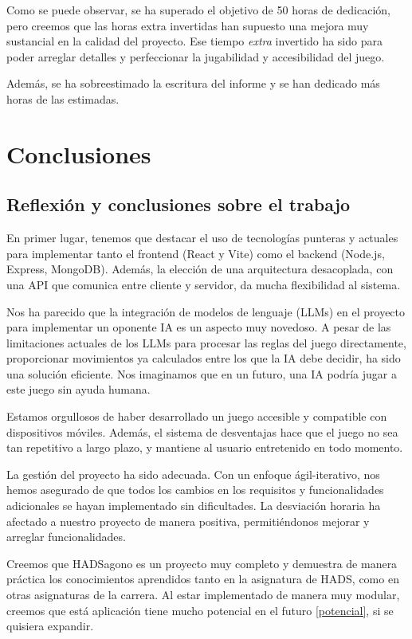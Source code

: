 \documentclass[12pt,epsf,titlepage,a4paper]{article}
\begin{document}
Como se puede observar, se ha superado el objetivo de 50 horas de dedicación, pero creemos que las horas extra invertidas han supuesto una mejora muy sustancial en la calidad del proyecto. Ese tiempo \emph{extra} invertido ha sido para poder arreglar detalles y perfeccionar la jugabilidad y accesibilidad del juego.

Además, se ha sobreestimado la escritura del informe y se han dedicado más horas de las estimadas.

\pagebreak

\section{Conclusiones}

\subsection{Reflexión y conclusiones sobre el trabajo}

En primer lugar, tenemos que destacar el uso de tecnologías punteras y actuales para implementar tanto el frontend (React y Vite) como el backend (Node.js, Express, MongoDB). Además, la elección de una arquitectura desacoplada, con una API que comunica entre cliente y servidor, da mucha flexibilidad al sistema.

Nos ha parecido que la integración de modelos de lenguaje (LLMs) en el proyecto para implementar un oponente IA es un aspecto muy novedoso. A pesar de las limitaciones actuales de los LLMs para procesar las reglas del juego directamente, proporcionar movimientos ya calculados entre los que la IA debe decidir, ha sido una solución eficiente. Nos imaginamos que en un futuro, una IA podría jugar a este juego sin ayuda humana.

Estamos orgullosos de haber desarrollado un juego accesible y compatible con dispositivos móviles. Además, el sistema de desventajas hace que el juego no sea tan repetitivo a largo plazo, y mantiene al usuario entretenido en todo momento.

La gestión del proyecto ha sido adecuada. Con un enfoque ágil-iterativo, nos hemos asegurado de que todos los cambios en los requisitos y funcionalidades adicionales se hayan implementado sin dificultades. La desviación horaria ha afectado a nuestro proyecto de manera positiva, permitiéndonos mejorar y arreglar funcionalidades.

Creemos que HADSagono es un proyecto muy completo y demuestra de manera práctica los conocimientos aprendidos tanto en la asignatura de HADS, como en otras asignaturas de la carrera. Al estar implementado de manera muy modular, creemos que está aplicación tiene mucho potencial en el futuro \ref{potencial}, si se quisiera expandir.
\end{document}
